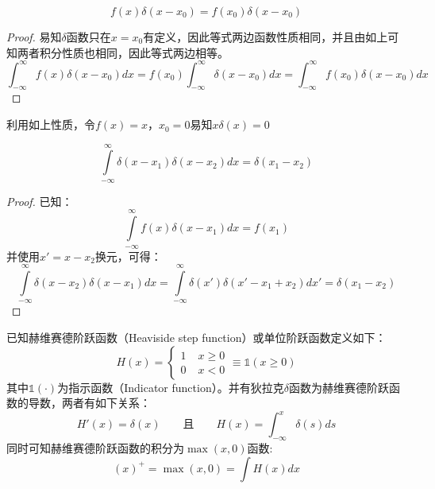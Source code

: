 \documentclass[11pt]{article}
\begin{document}
\begin{corollary}
    \begin{equation*}
        f(x)\delta(x-x_0) = f(x_0)\delta(x-x_0)        
    \end{equation*}
\end{corollary}

\begin{proof}
    易知$\delta$函数只在$x=x_0$有定义，因此等式两边函数性质相同，并且由如上可知两者积分性质也相同，因此等式两边相等。
    \begin{equation*}
        \int^{\infty}_{-\infty} f(x)\delta(x-x_0) dx 
        = f(x_0) \int^{\infty}_{-\infty} \delta(x-x_0) dx
        = \int^{\infty}_{-\infty} f(x_0)\delta(x-x_0) dx
    \end{equation*}
\end{proof}
利用如上性质，令$f(x)=x$，$x_0=0$易知$x\delta(x)=0$

\begin{corollary}
    \begin{equation*}
        \int\limits^{\infty}_{-\infty} \delta(x-x_1) \delta(x-x_2) dx = \delta(x_1-x_2)
    \end{equation*}
\end{corollary}

\begin{proof}
    已知：
    \begin{equation*}
        \int\limits^{\infty}_{-\infty} f(x) \delta(x-x_1) dx = f(x_1)
    \end{equation*}
    并使用$x'=x-x_2$换元，可得：
    \begin{equation*}
        \int\limits^{\infty}_{-\infty} \delta(x-x_2) \delta(x-x_1) dx
        = \int\limits^{\infty}_{-\infty} \delta(x') \delta(x'-x_1+x_2) dx'
        = \delta(x_1-x_2)
    \end{equation*}
\end{proof}

\begin{corollary}
    已知赫维赛德阶跃函数（Heaviside step function）或单位阶跃函数定义如下：
    \begin{equation*}
        H(x) =
        \begin{cases}
            1 \; & x \geq 0 \\
            0 \; & x<0
        \end{cases}
        \equiv \mathbb{1}(x \geq 0)
    \end{equation*}
    其中$\mathbb{1}(\cdot)$为指示函数（Indicator function）。并有狄拉克$\delta$函数为赫维赛德阶跃函数的导数，两者有如下关系：
    \begin{equation*}
        H'(x) = \delta(x) \qquad \text{且} \qquad H(x) = \int^{x}_{-\infty}\delta(s)ds
    \end{equation*}
    同时可知赫维赛德阶跃函数的积分为$\max(x,0)$函数:
    \begin{equation*}
        (x)^+ = \max(x,0) = \int H(x) dx
    \end{equation*}
\end{corollary}
\end{document}
